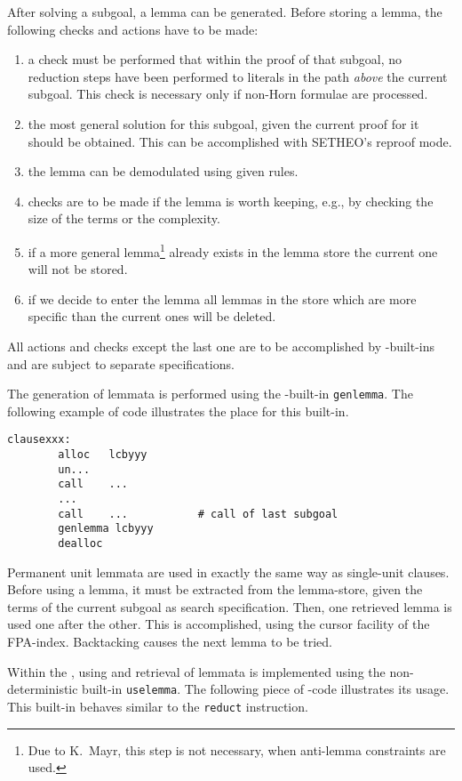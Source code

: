 After solving a subgoal, a lemma can be generated.
Before storing a lemma, the following checks and actions
have to be made:
\begin{enumerate}
\item
a check must be performed that within the proof of that subgoal, no
reduction steps have been performed to literals in the path {\em
above\/} the current subgoal.
This check is necessary only if non-Horn formulae are processed.
\item
the most general solution for this subgoal, given the current proof
for it should be obtained. This can be accomplished with SETHEO's
reproof mode.
\item
the lemma can be demodulated using given rules.
\item
checks are to be made if the lemma is worth keeping, e.g., by checking
the size of the terms or the complexity.
\item
if a more general lemma\footnote{Due to K.~Mayr, this step is
not necessary, when anti-lemma constraints are used.} already exists in the lemma store the current
one will not be stored.
\item
if we decide to enter the lemma all lemmas in the store which are more
specific than the current ones will be deleted.
\end{enumerate}

All actions and checks except the last one are to be accomplished by
\SAM-built-ins and are subject to separate specifications.


The generation of lemmata is performed using the \SAM-built-in
{\tt genlemma}. The following example of code illustrates the place for
this built-in.

\begin{verbatim}
clausexxx:
        alloc	lcbyyy
        un...
        call	...
        ...
        call	...           # call of last subgoal
        genlemma lcbyyy
        dealloc
\end{verbatim}

Permanent unit lemmata are used in exactly the same way as single-unit
clauses. Before using a lemma, it must be extracted from the lemma-store,
given the terms of the current subgoal as search specification.
Then, one retrieved lemma is used one after the other.
This is accomplished, using the cursor facility of the FPA-index.
Backtacking causes the next lemma to be tried.

Within the \SAM, using and retrieval of lemmata is implemented using
the non-deterministic built-in {\tt uselemma}.
The following piece of \SAM-code illustrates its usage.
This built-in behaves similar to the {\tt reduct} instruction.


